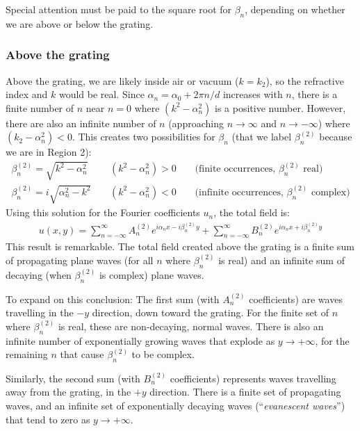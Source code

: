 Special attention must be paid to the square root for $\beta_n$, depending on whether we are above or below the grating.

\subsubsection{Above the grating}
  Above the grating, we are likely inside air or vacuum ($k=k_2$), so the refractive index and $k$ would be real.  Since $\alpha_n = \alpha_0 + 2\pi n/d$ increases with $n$, there is a finite number of $n$ near $n=0$ where $(k^2 - \alpha_n^2)$ is a positive number.  However, there are also an infinite number of $n$ (approaching $n\rightarrow \infty$ and $n\rightarrow -\infty$) where $(k_2 - \alpha_n^2) < 0$.  This creates two possibilities for $\beta_n$ (that we label $\beta^{(2)}_n$ because we are in Region 2):
\begin{align}
\beta^{(2)}_n = \sqrt{k^2 - \alpha_n^2} \;\;\;\; & (k^2-\alpha_n^2)>0 \;\;\;\; &\textrm{(finite occurrences, } \beta^{(2)}_n\textrm{ real)} \\
\beta^{(2)}_n = i\sqrt{\alpha_n^2 - k^2} \;\;\;\; & (k^2-\alpha_n^2)<0 \;\;\;\; &\textrm{(infinite occurrences, } \beta^{(2)}_n\textrm{ complex)}
\end{align}
Using this solution for the Fourier coefficients $u_n$, the total field is:
\begin{align}
u(x,y) =  \sum_{n=-\infty}^{\infty} A^{(2)}_n e^{i \alpha_n x - i \beta^{(2)}_n y} +  \sum_{n=-\infty}^{\infty} B^{(2)}_n e^{i \alpha_n x + i \beta^{(2)}_n y}
\end{align}
This result is remarkable.  The total field created above the grating is a finite sum of propagating plane waves (for all $n$ where $\beta^{(2)}_n$ is real) and an infinite sum of decaying (when $\beta^{(2)}_n$ is complex) plane waves.

To expand on this conclusion: The first sum (with $A^{(2)}_n$ coefficients) are waves travelling in the $-y$ direction, down toward the grating.  For the finite set of $n$ where $\beta^{(2)}_n$ is real, these are non-decaying, normal waves.  There is also  an infinite number of exponentially growing waves that explode as $y\rightarrow +\infty$, for the remaining $n$ that cause $\beta^{(2)}_n$ to be complex.

Similarly, the second sum (with $B^{(2)}_n$ coefficients) represents waves travelling away from the grating, in the $+y$ direction.  There is a finite set of propagating waves, and an infinite set of exponentially decaying waves (``\emph{evanescent waves}'') that tend to zero as $y \rightarrow +\infty$.  

